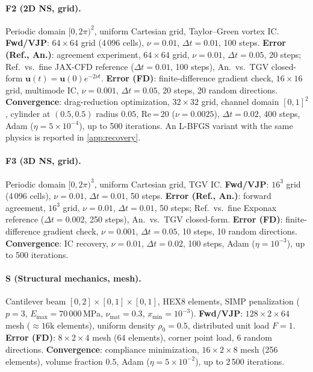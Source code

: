 \documentclass{article}
\begin{document}
\paragraph{F2 (2D NS, grid).}
Periodic domain $[0,2\pi)^2$, uniform Cartesian grid, Taylor--Green vortex IC\@.
\textbf{Fwd/VJP}: $64\times64$ grid (4\,096 cells), $\nu=0.01$, $\Delta t=0.01$, 100 steps.
\textbf{Error (Ref., An.)}: agreement experiment, $64\times64$ grid, $\nu=0.01$,
$\Delta t=0.05$, 20 steps; Ref.\ vs.\ fine JAX-CFD reference ($\Delta t=0.01$, 100 steps),
An.\ vs.\ TGV closed-form $\mathbf{u}(t)=\mathbf{u}(0)e^{-2\nu t}$.
\textbf{Error (FD)}: finite-difference gradient check, $16\times16$ grid, multimode IC,
$\nu=0.001$, $\Delta t=0.05$, 20 steps, 20 random directions.
\textbf{Convergence}: drag-reduction optimization, $32\times32$ grid, channel domain
$[0,1]^2$, cylinder at $(0.5,0.5)$ radius $0.05$, Re\,=\,20 ($\nu=0.0025$),
$\Delta t=0.02$, 400 steps, Adam ($\eta=5\times10^{-4}$), up to 500 iterations.
An L-BFGS variant with the same physics is reported in \cref{app:recovery}.

\paragraph{F3 (3D NS, grid).}
Periodic domain $[0,2\pi)^3$, uniform Cartesian grid, TGV IC\@.
\textbf{Fwd/VJP}: $16^3$ grid (4\,096 cells), $\nu=0.01$, $\Delta t=0.01$, 50 steps.
\textbf{Error (Ref., An.)}: forward agreement, $16^3$ grid, $\nu=0.01$, $\Delta t=0.01$,
50 steps; Ref.\ vs.\ fine Exponax reference ($\Delta t=0.002$, 250 steps),
An.\ vs.\ TGV closed-form.
\textbf{Error (FD)}: finite-difference gradient check, $\nu=0.001$, $\Delta t=0.05$,
10 steps, 10 random directions.
\textbf{Convergence}: IC recovery, $\nu=0.01$, $\Delta t=0.02$, 100 steps,
Adam ($\eta=10^{-3}$), up to 500 iterations.

\paragraph{S (Structural mechanics, mesh).}
Cantilever beam $[0,2]\times[0,1]\times[0,1]$, HEX8 elements, SIMP penalization
($p=3$, $E_\text{max}=70\,000$\,MPa, $\nu_\text{mat}=0.3$, $x_\text{min}=10^{-3}$).
\textbf{Fwd/VJP}: $128\times2\times64$ mesh (${\approx}16\text{k}$ elements), uniform
density $\rho_0=0.5$, distributed unit load $F=1$.
\textbf{Error (FD)}: $8\times2\times4$ mesh (64 elements), corner point load,
6 random directions.
\textbf{Convergence}: compliance minimization, $16\times2\times8$ mesh (256 elements),
volume fraction $0.5$, Adam ($\eta=5\times10^{-2}$), up to 2\,500 iterations.
\end{document}
